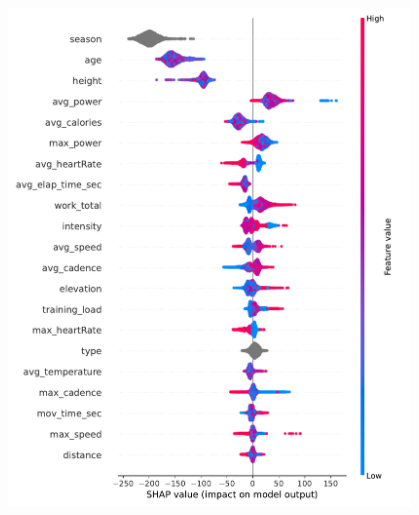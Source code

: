 \documentclass[12pt,a4paper]{article}
\let\origfigure\figure
\let\endorigfigure\endfigure
\renewenvironment{figure}[1][2] {
    \expandafter\origfigure\expandafter[H]
} {
    \endorigfigure
}
\begin{document}
\begin{figure}
\centering
\hspace{-3cm}\includegraphics[width=0.8\textwidth]{./includes/shap/lightgbm/summary_UCI_points.pdf}
    \caption{This figure shows the summary of each variable with respect to each observation of model 1 fitted with the Lightgbm algorithm predicting the UCI weekly points. All values were calculated from the test dataset.}
    \label{fig:summary_UCI}
\end{figure}
\end{document}
